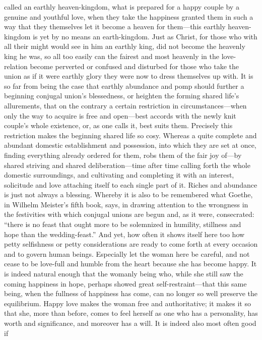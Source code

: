 \documentclass[12pt,a4paper]{book}
\begin{document}
called an earthly heaven-kingdom, what is prepared for a happy couple by a
genuine and youthful love, when they take the happiness granted them in
such a way that they themselves let it become a heaven for them---this
earthly heaven-kingdom is yet by no means an earth-kingdom. Just as Christ,
for those who with all their might would see in him an earthly king, did
not become the heavenly king he was, so all too easily can the fairest and
most heavenly in the love-relation become perverted or confused and
disturbed for those who take the union as if it were earthly glory they
were now to dress themselves up with. It is so far from being the case that
earthly abundance and pomp should further a beginning conjugal union's
blessedness, or heighten the forming shared life's allurements, that on the
contrary a certain restriction in circumstances---when only the way to
acquire is free and open---best accords with the newly knit couple's whole
existence, or, as one calls it, best suits them. Precisely this restriction
makes the beginning shared life so cosy. Whereas a quite complete and
abundant domestic establishment and possession, into which they are set at
once, finding everything already ordered for them, robs them of the fair
joy of---by shared striving and shared deliberation---time after time
calling forth the whole domestic surroundings, and cultivating and
completing it with an interest, solicitude and love attaching itself to
each single part of it. Riches and abundance is just not always a blessing.
Whereby it is also to be remembered what Goethe, in Wilhelm Meister's fifth
book, says, in drawing attention to the wrongness in the festivities with
which conjugal unions are begun and, as it were, consecrated: ``there is no
feast that ought more to be solemnized in humility, stillness and hope than
the wedding-feast.'' And yet, how often it shows itself here too how petty
selfishness or petty considerations are ready to come forth at every
occasion and to govern human beings. Especially let the woman here be
careful, and not cease to be love-full and humble from the heart because
she has become happy. It is indeed natural enough that the womanly being
who, while she still saw the coming happiness in hope, perhaps showed great
self-restraint---that this same being, when the fullness of happiness has
come, can no longer so well preserve the equilibrium. Happy love makes the
woman free and authoritative; it makes it so that she, more than before,
comes to feel herself as one who has a personality, has worth and
significance, and moreover has a will. It is indeed also most often good if
\end{document}
